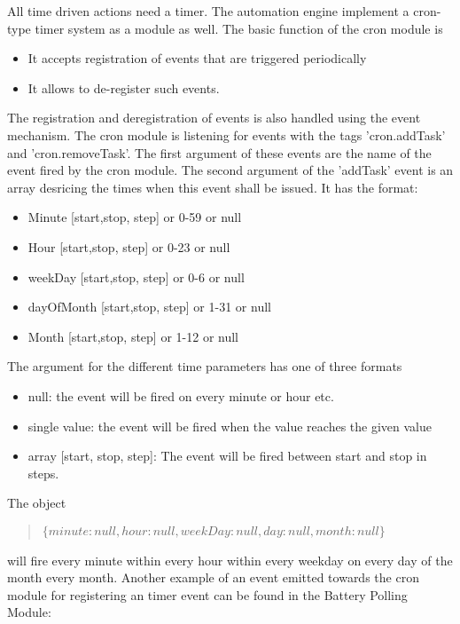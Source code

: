 All time driven actions need a timer. The \zway automation engine implement a cron-type timer 
system as a module as well. The basic function of the cron module is

\begin{itemize}
\item It accepts registration of events that are triggered periodically
\item It allows to de-register such events. 
\end{itemize}


The registration and deregistration of events is also handled using the event mechanism. 
The cron module is listening for events with the tags 'cron.addTask' and  'cron.removeTask'. 
The first argument of these events are the name of the event fired by the cron module. The 
second argument of the 'addTask' event is an array desricing the times when this event 
shall be issued. It has the format: 
\begin{itemize}
\item Minute [start,stop, step] or 0-59 or null
\item Hour [start,stop, step] or 0-23 or null
\item weekDay [start,stop, step] or 0-6 or null
\item dayOfMonth [start,stop, step] or 1-31 or null
\item Month [start,stop, step] or 1-12 or null
\end{itemize}
The argument for the different time parameters has one of three formats
\begin{itemize}
\item null: the event will be fired on every minute or hour etc.
\item single value: the event will be fired when the value reaches the given value
\item array [start, stop, step]: The event will be fired between start and stop in steps.
\end{itemize}
 
 The object  
\begin{quote}
{\tt  $\{minute: null,hour: null,weekDay: null, day: null, month: null\} $   }
\end{quote} 

will fire every minute within every hour within every weekday on every day of the month 
every month. Another example of an event emitted towards the cron 
module for registering an timer event can be found in the Battery Polling Module:

